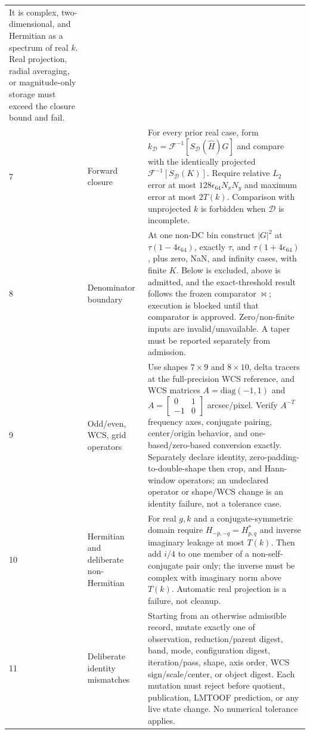 \documentclass[11pt]{article}
\newcommand{\IFFT}{\mathcal{F}^{-1}}
\begin{document}
\begin{longtable}{@{}L{0.05\textwidth}L{0.24\textwidth}L{0.62\textwidth}@{}}
It is complex, two-dimensional, and Hermitian as a spectrum of real $k$.
Real projection, radial averaging, or magnitude-only storage must exceed the
closure bound and fail. \\
7 & Forward closure & For every prior real case, form
$k_{\mathcal D}=\IFFT[S_{\mathcal D}(\widehat H)G]$ and compare with the
identically projected $\IFFT[S_{\mathcal D}(K)]$.  Require relative $L_2$
error at most $128\epsilon_{64}N_xN_y$ and maximum error at most $2T(k)$.
Comparison with unprojected $k$ is forbidden when $\mathcal D$ is incomplete. \\
8 & Denominator boundary & At one non-DC bin construct $|G|^2$ at
$\tau(1-4\epsilon_{64})$, exactly $\tau$, and
$\tau(1+4\epsilon_{64})$, plus zero, NaN, and infinity cases, with finite $K$.
Below is excluded, above is admitted, and the exact-threshold result follows
the frozen comparator $\bowtie$; execution is blocked until that comparator is
approved.  Zero/non-finite inputs are invalid/unavailable.  A taper must be
reported separately from admission. \\
9 & Odd/even, WCS, grid operators & Use shapes $7\times9$ and $8\times10$,
delta tracers at the full-precision WCS reference, and WCS matrices
$A=\mathrm{diag}(-1,1)$ and
$A=\begin{bmatrix}0&1\\-1&0\end{bmatrix}$ arcsec/pixel.  Verify
$A^{-T}$ frequency axes, conjugate pairing, center/origin behavior, and
one-based/zero-based conversion exactly.  Separately declare identity,
zero-padding-to-double-shape then crop, and Hann-window operators; an undeclared
operator or shape/WCS change is an identity failure, not a tolerance case. \\
10 & Hermitian and deliberate non-Hermitian & For real $g,k$ and a
conjugate-symmetric domain require
$H_{-p,-q}=H_{p,q}^*$ and inverse imaginary leakage at most $T(k)$.  Then add
$i/4$ to one member of a non-self-conjugate pair only; the inverse must be
complex with imaginary norm above $T(k)$.  Automatic real projection is a
failure, not cleanup. \\
11 & Deliberate identity mismatches & Starting from an otherwise admissible
record, mutate exactly one of observation, reduction/parent digest, band,
mode, configuration digest, iteration/pass, shape, axis order, WCS
sign/scale/center, or object digest.  Each mutation must reject before quotient,
publication, LMTOOF prediction, or any live state change.  No numerical
tolerance applies. \\
\bottomrule
\end{longtable}
\end{document}

